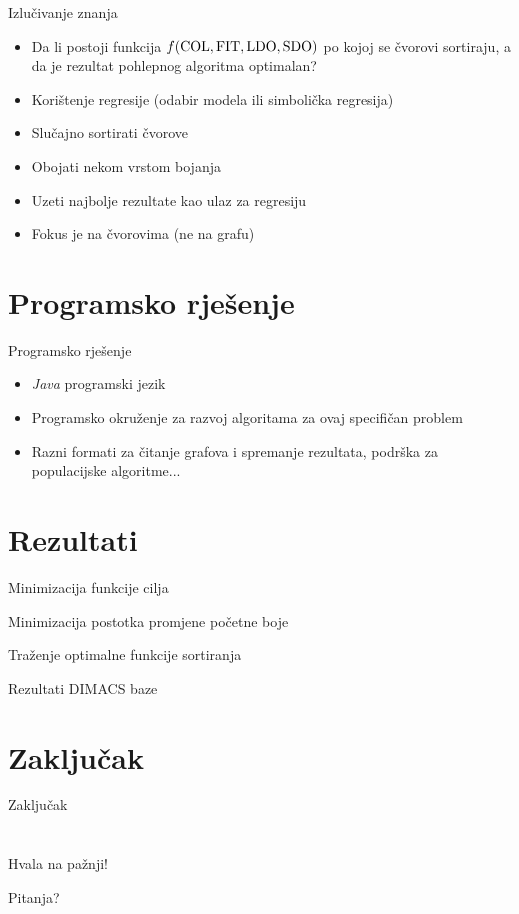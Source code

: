 \documentclass[utf8]{beamer}
\begin{document}
\begin{frame}{Izlučivanje znanja}
	\begin{itemize}
		\item Da li postoji funkcija $f(\textup{COL}, \textup{FIT}, \textup{LDO}, \textup{SDO})$ po kojoj se čvorovi sortiraju, a da je rezultat pohlepnog algoritma optimalan?
		\pause
		\item Korištenje regresije (odabir modela ili simbolička regresija)
		\pause
		\item Slučajno sortirati čvorove
		\pause
		\item Obojati nekom vrstom bojanja
		\pause
		\item Uzeti najbolje rezultate kao ulaz za regresiju
		\pause
		\item Fokus je na čvorovima (ne na grafu)
	\end{itemize}
\end{frame}


\section{Programsko rješenje}
\begin{frame}{Programsko rješenje}
	\begin{itemize}
		\item \emph{Java} programski jezik
		\pause
		\item Programsko okruženje za razvoj algoritama za ovaj specifičan problem
		\pause
		\item Razni formati za čitanje grafova i spremanje rezultata, podrška za populacijske algoritme...
	\end{itemize}
\end{frame}


\section{Rezultati}
\begin{frame}{Minimizacija funkcije cilja}
\end{frame}

\begin{frame}{Minimizacija postotka promjene početne boje}
\end{frame}

\begin{frame}{Traženje optimalne funkcije sortiranja}
\end{frame}

\begin{frame}{Rezultati DIMACS baze}
\end{frame}

\section{Zaključak}
\begin{frame}{Zaključak}
\end{frame}


\section*{}
\begin{frame}{}
\center
\Huge{Hvala na pažnji!}
\end{frame}

\begin{frame}{}
\center
\Huge{Pitanja?}

\end{frame}
\end{document}
